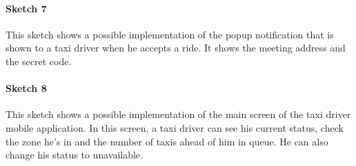 \paragraph{Sketch 7}
This sketch shows a possible implementation of the popup notification that is shown to a taxi driver when he accepts a ride. It shows the meeting address and the secret code.
\begin{figure}[H]
\centering
{}
\end{figure}


\paragraph{Sketch 8}
This sketch shows a possible implementation of the main screen of the taxi driver mobile application. In this screen, a taxi driver can see his current status, check the zone he's in and the number of taxis ahead of him in queue. He can also change his status to unavailable.
\begin{figure}[H]
\centering
{}
\end{figure}


